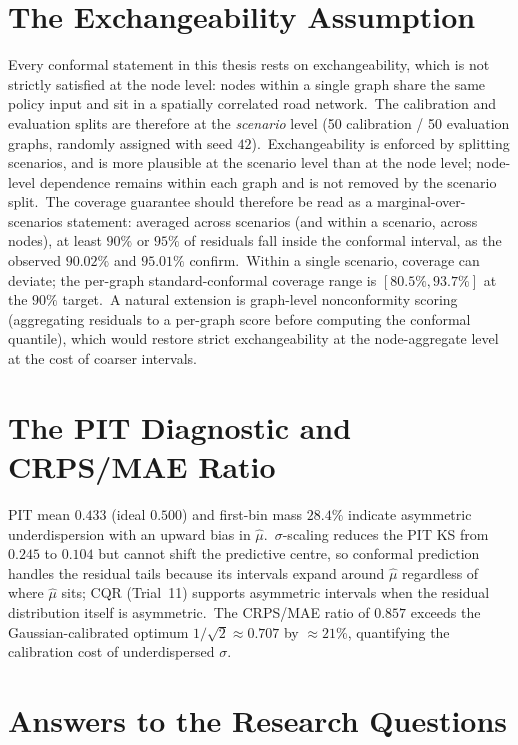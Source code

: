 \section{The Exchangeability Assumption}\label{sec:exchangeability}

Every conformal statement in this thesis rests on exchangeability, which is not strictly satisfied at the node level: nodes within a single graph share the same policy input and sit in a spatially correlated road network.\ The calibration and evaluation splits are therefore at the \emph{scenario} level (50 calibration / 50 evaluation graphs, randomly assigned with seed $42$).\ Exchangeability is enforced by splitting scenarios, and is more plausible at the scenario level than at the node level; node-level dependence remains within each graph and is not removed by the scenario split.\ The coverage guarantee should therefore be read as a marginal-over-scenarios statement: averaged across scenarios (and within a scenario, across nodes), at least $90\%$ or $95\%$ of residuals fall inside the conformal interval, as the observed $90.02\%$ and $95.01\%$ confirm.\ Within a single scenario, coverage can deviate; the per-graph standard-conformal coverage range is $[80.5\%, 93.7\%]$ at the $90\%$ target.\ A natural extension is graph-level nonconformity scoring (aggregating residuals to a per-graph score before computing the conformal quantile), which would restore strict exchangeability at the node-aggregate level at the cost of coarser intervals.

\section{The PIT Diagnostic and CRPS/MAE Ratio}\label{sec:pit_discussion}

PIT mean $0.433$ (ideal $0.500$) and first-bin mass $28.4\%$ indicate asymmetric underdispersion with an upward bias in $\hat\mu$.\ $\sigma$-scaling reduces the PIT KS from $0.245$ to $0.104$ but cannot shift the predictive centre, so conformal prediction handles the residual tails because its intervals expand around $\hat\mu$ regardless of where $\hat\mu$ sits; CQR (Trial~11) supports asymmetric intervals when the residual distribution itself is asymmetric.\ The CRPS/MAE ratio of $0.857$ exceeds the Gaussian-calibrated optimum $1/\sqrt{2} \approx 0.707$ by $\approx 21\%$, quantifying the calibration cost of underdispersed $\sigma$.

\section{Answers to the Research Questions}\label{sec:rq_answers}

